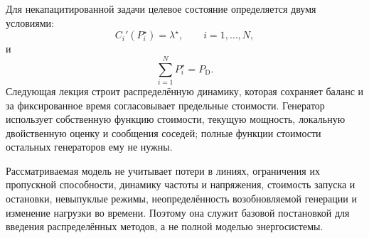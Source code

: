Для некапацитированной задачи целевое состояние определяется двумя
условиями:
\[
    C_i'(P_i^\star)=\lambda^\star,
    \qquad i=1,\ldots,N,
\]
и
\[
    \sum_{i=1}^{N}P_i^\star=P_{\mathrm D}.
\]
Следующая лекция строит распределённую динамику, которая сохраняет
баланс и за фиксированное время согласовывает предельные стоимости.
Генератор использует собственную функцию стоимости, текущую мощность,
локальную двойственную оценку и сообщения соседей; полные функции
стоимости остальных генераторов ему не нужны.

Рассматриваемая модель не учитывает потери в линиях, ограничения их
пропускной способности, динамику частоты и напряжения, стоимость
запуска и остановки, невыпуклые режимы, неопределённость
возобновляемой генерации и изменение нагрузки во времени. Поэтому она
служит базовой постановкой для введения распределённых методов, а не
полной моделью энергосистемы.
